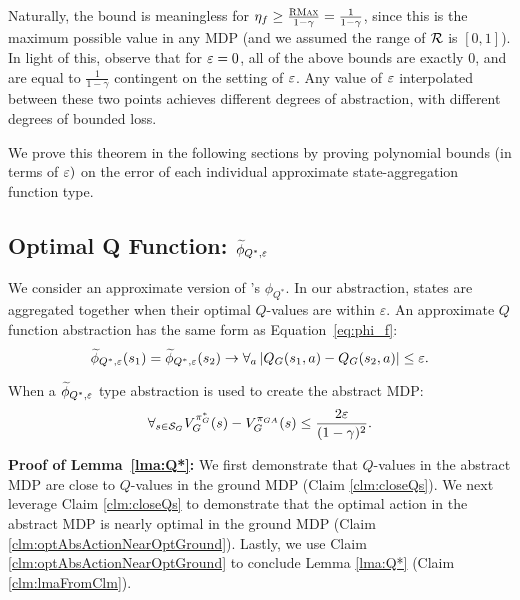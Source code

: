 Naturally, the bound is meaningless for $\eta_f \geq \frac{\textsc{RMax}}{1-\gamma} = \frac{1}{1-\gamma}$, since this is the maximum possible value in any MDP (and we assumed the range of $\mathcal{R}$ is $[0,1]$). In light of this, observe that for $\varepsilon = 0$, all of the above bounds are exactly 0, and are equal to $\frac{1}{1-\gamma}$ contingent on the setting of $\varepsilon$. Any value of $\varepsilon$ interpolated between these two points achieves different degrees of abstraction, with different degrees of bounded loss.

We prove this theorem in the following sections by proving polynomial bounds (in terms of $\varepsilon)$ on the error of each individual approximate state-aggregation function type.

\subsection{Optimal Q Function: $\widetilde \phi_{Q^*,\varepsilon}$}
\label{sec:Q*}

We consider an approximate version of \citet{li2006towards}'s $\phi_{Q^*}$. In our abstraction, states are aggregated together when their optimal $Q$-values are within $\varepsilon$.
\bdefn{$\epQ$}
An approximate $Q$ function abstraction has the same form as Equation~\ref{eq:phi_f}:
\vspace{-1mm}%
\begin{equation}
\widetilde \phi_{Q^*,\varepsilon}(s_1) = \widetilde \phi_{Q^*,\varepsilon}(s_2) \rightarrow \forall_a \left|Q_G(s_1, a) - Q_G(s_2, a)\right| \leq \varepsilon.
\end{equation}
\edefn

\begin{lma}
\label{lma:Q*}
When a $\widetilde \phi_{Q^*,\varepsilon}$ type abstraction is used to create the abstract \ac{MDP}:
\vspace{-2mm}%
\begin{equation}
\forall_{s \in \mathcal{S}_G} V_G^{\pi_G^*}(s) - V_G^{\pi_{GA}}(s) \leq \frac{2\varepsilon}{(1-\gamma)^2}.
\end{equation}
\vspace{-4mm}%
\end{lma}
\noindent \textbf{Proof of Lemma~\ref{lma:Q*}:}
We first demonstrate that $Q$-values in the abstract \ac{MDP} are close to $Q$-values in the ground \ac{MDP} (Claim \ref{clm:closeQs}). We next leverage Claim \ref{clm:closeQs} to demonstrate that the optimal action in the abstract \ac{MDP} is nearly optimal in the ground \ac{MDP}  (Claim \ref{clm:optAbsActionNearOptGround}). Lastly, we use Claim \ref{clm:optAbsActionNearOptGround} to conclude Lemma \ref{lma:Q*} (Claim \ref{clm:lmaFromClm}). \\

